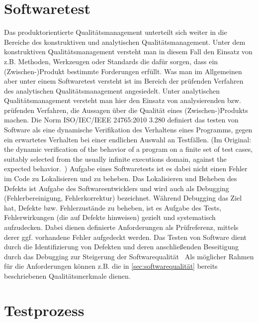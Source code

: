 \section{Softwaretest}
\label{sec:softwaretest}

Das produktorientierte Qualitätsmanagement unterteilt sich weiter in die Bereiche des konstruktiven und analytischen Qualitätsmanagement.
Unter dem konstruktiven Qualitätsmanagement versteht man in diesem Fall den Einsatz von z.B. Methoden, Werkzeugen oder Standards die dafür sorgen, dass ein (Zwischen-)Produkt bestimmte Forderungen erfüllt.
Was man im Allgemeinen aber unter einem Softwaretest versteht ist im Bereich der prüfenden Verfahren des analytischen Qualitätsmanagement angesiedelt.
Unter analytischen Qualitätsmanagement versteht man hier den Einsatz von analysierenden bzw. prüfenden Verfahren, die Aussagen über die Qualität eines (Zwischen-)Produkts machen. \newline
Die Norm ISO/IEC/IEEE 24765:2010 3.280 definiert das testen von Software als eine dynamische Verifikation des Verhaltens eines Programms, gegen ein erwartetes Verhalten bei einer endlichen Auswahl an Testfällen. (Im Original: \glqq the dynamic verification of the behavior of a program on a finite set of test cases, suitably selected from the usually infinite executions domain, against the expected behavior.\grqq\ \cite{iso/iec/ieee_systems_2010})
Aufgabe eines Softwaretests ist es dabei nicht einen Fehler im Code zu Lokalisieren und zu beheben.
Das Lokalisieren und Beheben des Defekts ist Aufgabe des Softwareentwicklers und wird auch als Debugging (Fehlerbereinigung, Fehlerkorrektur) bezeichnet.
Während Debugging das Ziel hat, Defekte bzw. Fehlerzustände zu beheben, ist es Aufgabe des Tests, Fehlerwirkungen (die auf Defekte hinweisen) gezielt und systematisch aufzudecken. \cite{spillner_basiswissen_2007}
Dabei dienen definierte Anforderungen als Prüfreferenz, mittels derer ggf. vorhandene Fehler aufgedeckt werden.
\glqq Das Testen von Software dient durch die Identifizierung von Defekten und deren anschließenden Beseitigung durch das Debugging zur Steigerung der Softwarequalität\grqq\ \cite{spillner_basiswissen_2007}
Als möglicher Rahmen für die Anforderungen können z.B. die in \ref{sec:softwarequalität} bereits beschriebenen Qualitätsmerkmale dienen.


\section{Testprozess}
\label{sec:testprozess}

